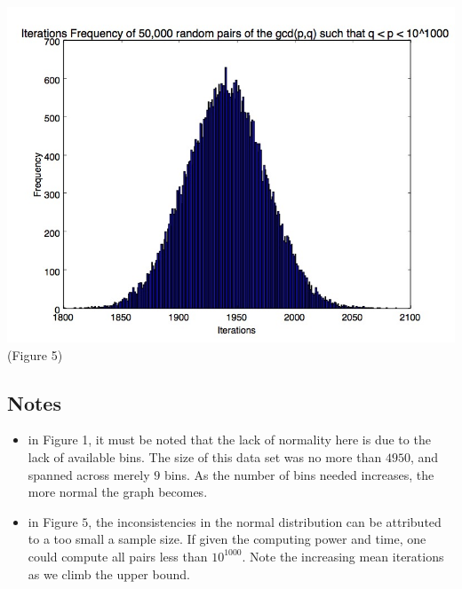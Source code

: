 \documentclass{beamer}
\begin{document}
\begin{frame}
		\center \includegraphics[scale=.3]{1000_digit_numbers.jpg}
		\center \tiny(Figure 5)

\end{frame}

\subsection{Notes}
\begin{frame}
\begin{itemize}
\item in Figure 1, it must be noted that the lack of normality here is due to the lack of available bins. The size of this data set was no more than $4950$, and spanned across merely $9$ bins. As the number of bins needed increases, the more normal the graph becomes.
\item in Figure $5$, the inconsistencies in the normal distribution can be attributed to a too small a sample size. If given the computing power and time, one could compute all pairs less than $10^{1000}$. Note the increasing mean iterations as we climb the upper bound.
\end{itemize}

\end{frame}
\end{document}
